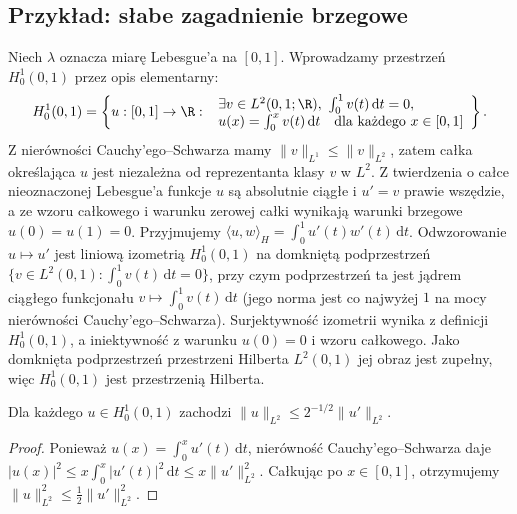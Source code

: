 \subsection{Przykład: słabe zagadnienie brzegowe}

Niech $\lambda$ oznacza miarę Lebesgue'a na $[0,1]$.
Wprowadzamy przestrzeń $H_0^1(0,1)$ przez opis elementarny:
\[
H_0^1(0,1)=\left\{u:[0,1]\to\R:\ 
\begin{array}{l}
\exists v\in L^2(0,1;\R),\ \int_0^1 v(t)\,\mathrm dt=0,\\
u(x)=\int_0^x v(t)\,\mathrm dt\quad\text{dla każdego }x\in[0,1]
\end{array}\right\}.
\]
Z nierówności Cauchy'ego--Schwarza mamy
$\|v\|_{L^1}\le\|v\|_{L^2}$, zatem całka określająca $u$
jest niezależna od reprezentanta klasy $v$ w $L^2$.
Z twierdzenia o całce nieoznaczonej Lebesgue'a
funkcje $u$ są absolutnie ciągłe i $u'=v$ prawie wszędzie,
a ze wzoru całkowego i warunku zerowej całki wynikają
warunki brzegowe $u(0)=u(1)=0$. Przyjmujemy
$\langle u,w\rangle_H=\int_0^1u'(t)w'(t)\,\mathrm dt$.
Odwzorowanie $u\mapsto u'$ jest liniową izometrią
$H_0^1(0,1)$ na domkniętą podprzestrzeń
$\{v\in L^2(0,1):\int_0^1v(t)\,\mathrm dt=0\}$,
przy czym podprzestrzeń ta jest jądrem ciągłego funkcjonału
$v\mapsto\int_0^1v(t)\,\mathrm dt$ (jego norma jest co najwyżej $1$
na mocy nierówności Cauchy'ego--Schwarza).
Surjektywność izometrii wynika z definicji $H_0^1(0,1)$,
a iniektywność z warunku $u(0)=0$ i wzoru całkowego.
Jako domknięta podprzestrzeń przestrzeni Hilberta $L^2(0,1)$
jej obraz jest zupełny, więc $H_0^1(0,1)$ jest przestrzenią Hilberta.

\begin{lemat}
\label{lem:poincare16}
Dla każdego $u\in H_0^1(0,1)$ zachodzi
$\|u\|_{L^2}\le2^{-1/2}\|u'\|_{L^2}$.
\end{lemat}
\begin{proof}
Ponieważ $u(x)=\int_0^xu'(t)\,\mathrm dt$,
nierówność Cauchy'ego--Schwarza daje
$|u(x)|^2\le x\int_0^x|u'(t)|^2\,\mathrm dt
\le x\|u'\|_{L^2}^2$.
Całkując po $x\in[0,1]$, otrzymujemy
$\|u\|_{L^2}^2\le\frac12\|u'\|_{L^2}^2$.
\end{proof}

